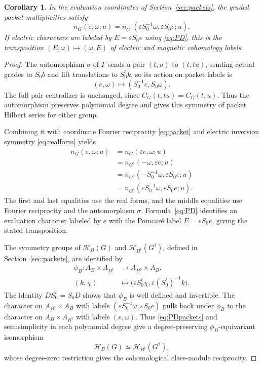 \documentclass[11pt,a4paper,reqno]{amsart}
\theoremstyle{plain}
\newtheorem{corollary}[theorem]{Corollary}
\theoremstyle{definition}
\theoremstyle{remark}
\numberwithin{equation}{section}
\newcommand{\cH}{\mathcal H}
\begin{document}
\begin{corollary}\label{cor:poincare-packets}
In the evaluation coordinates of Section~\ref{sec:packets}, the graded packet multiplicities satisfy
\begin{equation}\label{eq:PDpackets}
n_G(e,\omega;u)
=n_{G^\dagger}(\varepsilon S_0^{-1}\omega,\varepsilon S_0e;u).
\end{equation}
If electric characters are labeled by $E=\varepsilon S_0e$ using \eqref{eq:PD}, this is the transposition $(E,\omega)\mapsto(\omega,E)$ of electric and magnetic cohomology labels.
\end{corollary}
\begin{proof}
The automorphism $\sigma$ of $\Gamma$ sends a pair $(t,u)$ to $(t,tu)$, sending actual grades to $S_0b$ and lift translations to $S_0^tk$, so its action on packet labels is
\[
(e,\omega)\longmapsto(S_0^{-1}e,S_0\omega).
\]
The full pair centralizer is unchanged, since $C_G(t,tu)=C_G(t,u)$. Thus the automorphism preserves polynomial degree and gives this symmetry of packet Hilbert series for either group.

Combining it with coordinate Fourier reciprocity \eqref{eq:packet} and electric inversion symmetry \eqref{eq:realform} yields
\[
\begin{aligned}
n_G(e,\omega;u)
&=n_G(\varepsilon e,\omega;u)\\
&=n_{G^\dagger}(-\omega,\varepsilon e;u)\\
&=n_{G^\dagger}(-S_0^{-1}\omega,\varepsilon S_0e;u)\\
&=n_{G^\dagger}(\varepsilon S_0^{-1}\omega,\varepsilon S_0e;u).
\end{aligned}
\]
The first and last equalities use the real forms, and the middle equalities use Fourier reciprocity and the automorphism $\sigma$. Formula~\eqref{eq:PD} identifies an evaluation character labeled by $e$ with the Poincar\'e label $E=\varepsilon S_0e$, giving the stated transposition.

The symmetry groups of $\cH_B(G)$ and $\cH_{B^\dagger}(G^\dagger)$, defined in Section~\ref{sec:packets}, are identified by
\[
\begin{aligned}
\phi_B\colon A_B\times A_{B^\dagger}&\longrightarrow A_{B^\dagger}\times A_B,\\
(k,\chi)&\longmapsto
\bigl(\varepsilon S_0^t\chi,
      \varepsilon(S_0^t)^{-1}k\bigr).
\end{aligned}
\]
The identity $D S_0^t=S_0D$ shows that $\phi_B$ is well defined and invertible. The character on $A_{B^\dagger}\times A_B$ with labels $(\varepsilon S_0^{-1}\omega,\varepsilon S_0e)$ pulls back under $\phi_B$ to the character on $A_B\times A_{B^\dagger}$ with labels $(e,\omega)$. Thus \eqref{eq:PDpackets} and semisimplicity in each polynomial degree give a degree-preserving $\phi_B$-equivariant isomorphism
\[
\cH_B(G)\simeq\cH_{B^\dagger}(G^\dagger),
\]
whose degree-zero restriction gives the cohomological class-module reciprocity.
\end{proof}
\end{document}
